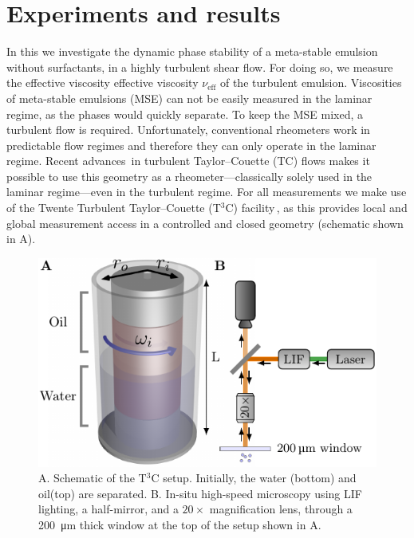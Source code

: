 \section{Experiments and results}%
\fi%
\indent In this \docname we investigate the dynamic phase stability of a meta-stable emulsion without surfactants, in a highly turbulent shear flow. For doing so, we measure the effective viscosity effective viscosity $\nu_\text{eff}$ of the turbulent emulsion. 
Viscosities of meta-stable emulsions (MSE) can not be easily measured in the laminar regime, as the phases would quickly separate. To keep the MSE mixed, a turbulent flow is required. Unfortunately, conventional rheometers work in predictable flow regimes and therefore they can only operate in the laminar regime. Recent advances\,\cite{Grossmann2016} in turbulent Taylor--Couette (TC) flows makes it possible to use this geometry as a rheometer---classically solely used in the laminar regime---even in the turbulent regime.
For all measurements we make use of the Twente Turbulent Taylor--Couette
(T${}^3$C) facility\,\cite{vanGils2011}, as this provides local and global
measurement access in a controlled and closed geometry (schematic shown in
A).
%
\begin{figure}
\centering
\includegraphics{SetupSchematic.pdf}
\caption{%
A. Schematic of the T$^3$C setup.
Initially, the water (bottom) and oil(top) are separated.
B. In-situ high-speed microscopy using LIF lighting, a
half-mirror, and a $20\times$ magnification lens, through a \SI{200}{\micro\meter}
thick window at the top of the setup shown in A.%
}
\label{fig:setupoil}
\end{figure}%
